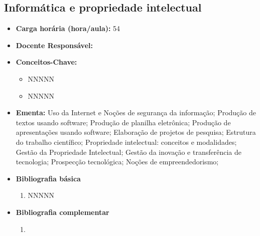 \documentclass[11pt,fleqn]{book} %
\begin{document}
\subsection{Informática e propriedade intelectual}\label{disc:info}
\begin{itemize}
	\item \textbf{Carga horária (hora/aula):} 54
	\item \textbf{Docente Responsável:}
	\item \textbf{Conceitos-Chave:}
	\begin{itemize}
		\item NNNNN
		\item NNNNN
	\end{itemize}
	\item \textbf{Ementa:} Uso da Internet e Noções de segurança da informação;
	Produção de textos usando software;
	Produção de planilha eletrônica;
	Produção de apresentações usando software;
	Elaboração de projetos de pesquisa; 
	Estrutura do trabalho científico;
	Propriedade intelectual: conceitos e modalidades;
	Gestão da Propriedade Intelectual;
	Gestão da inovação e transferência de tecnologia;
	Prospecção tecnológica;
	Noções de empreendedorismo;
	\item \textbf{Bibliografia básica}
	\begin{enumerate}
		\item NNNNN
	\end{enumerate}
	\item \textbf{Bibliografia complementar}
	\begin{enumerate}
		\item 
	\end{enumerate}	
\end{itemize}

\newpage
\end{document}
